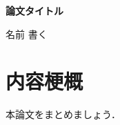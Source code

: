 ﻿%

\begin{center}
  \large\bf 論文タイトル
\end{center}
\begin{flushright}
名前 書く
\end{flushright}

\vspace*{-12mm}
\section*{\normalsize 内容梗概}
本論文をまとめましょう．

